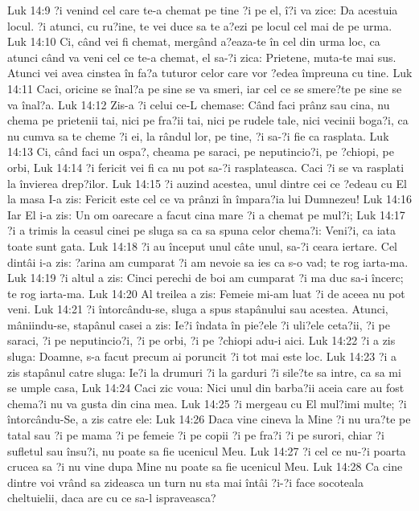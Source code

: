 Luk 14:9  ?i venind cel care te-a chemat pe tine ?i pe el, î?i va zice: Da acestuia locul. ?i atunci, cu ru?ine, te vei duce sa te a?ezi pe locul cel mai de pe urma.
Luk 14:10  Ci, când vei fi chemat, mergând a?eaza-te în cel din urma loc, ca atunci când va veni cel ce te-a chemat, el sa-?i zica: Prietene, muta-te mai sus. Atunci vei avea cinstea în fa?a tuturor celor care vor ?edea împreuna cu tine.
Luk 14:11  Caci, oricine se înal?a pe sine se va smeri, iar cel ce se smere?te pe sine se va înal?a.
Luk 14:12  Zis-a ?i celui ce-L chemase: Când faci prânz sau cina, nu chema pe prietenii tai, nici pe fra?ii tai, nici pe rudele tale, nici vecinii boga?i, ca nu cumva sa te cheme ?i ei, la rândul lor, pe tine, ?i sa-?i fie ca rasplata.
Luk 14:13  Ci, când faci un ospa?, cheama pe saraci, pe neputincio?i, pe ?chiopi, pe orbi,
Luk 14:14  ?i fericit vei fi ca nu pot sa-?i rasplateasca. Caci ?i se va rasplati la învierea drep?ilor.
Luk 14:15  ?i auzind acestea, unul dintre cei ce ?edeau cu El la masa I-a zis: Fericit este cel ce va prânzi în împara?ia lui Dumnezeu!
Luk 14:16  Iar El i-a zis: Un om oarecare a facut cina mare ?i a chemat pe mul?i;
Luk 14:17  ?i a trimis la ceasul cinei pe sluga sa ca sa spuna celor chema?i: Veni?i, ca iata toate sunt gata.
Luk 14:18  ?i au început unul câte unul, sa-?i ceara iertare. Cel dintâi i-a zis: ?arina am cumparat ?i am nevoie sa ies ca s-o vad; te rog iarta-ma.
Luk 14:19  ?i altul a zis: Cinci perechi de boi am cumparat ?i ma duc sa-i încerc; te rog iarta-ma.
Luk 14:20  Al treilea a zis: Femeie mi-am luat ?i de aceea nu pot veni.
Luk 14:21  ?i întorcându-se, sluga a spus stapânului sau acestea. Atunci, mâniindu-se, stapânul casei a zis: Ie?i îndata în pie?ele ?i uli?ele ceta?ii, ?i pe saraci, ?i pe neputincio?i, ?i pe orbi, ?i pe ?chiopi adu-i aici.
Luk 14:22  ?i a zis sluga: Doamne, s-a facut precum ai poruncit ?i tot mai este loc.
Luk 14:23  ?i a zis stapânul catre sluga: Ie?i la drumuri ?i la garduri ?i sile?te sa intre, ca sa mi se umple casa,
Luk 14:24  Caci zic voua: Nici unul din barba?ii aceia care au fost chema?i nu va gusta din cina mea.
Luk 14:25  ?i mergeau cu El mul?imi multe; ?i întorcându-Se, a zis catre ele:
Luk 14:26  Daca vine cineva la Mine ?i nu ura?te pe tatal sau ?i pe mama ?i pe femeie ?i pe copii ?i pe fra?i ?i pe surori, chiar ?i sufletul sau însu?i, nu poate sa fie ucenicul Meu.
Luk 14:27  ?i cel ce nu-?i poarta crucea sa ?i nu vine dupa Mine nu poate sa fie ucenicul Meu.
Luk 14:28  Ca cine dintre voi vrând sa zideasca un turn nu sta mai întâi ?i-?i face socoteala cheltuielii, daca are cu ce sa-l ispraveasca?
